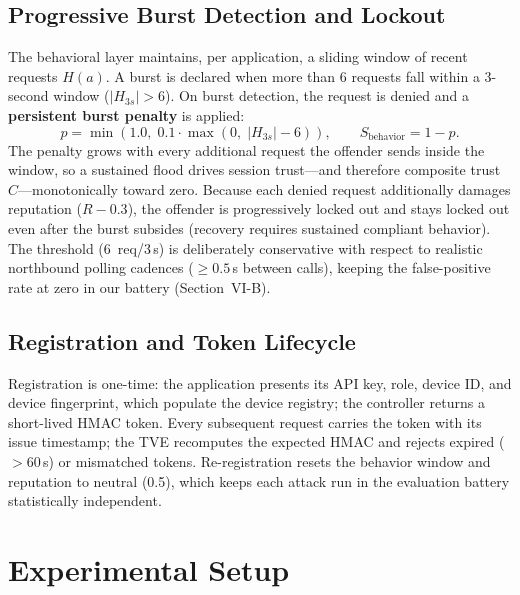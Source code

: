 \documentclass[journal]{IEEEtran}
\begin{document}
\subsection{Progressive Burst Detection and Lockout}
The behavioral layer maintains, per application, a sliding window of recent requests $H(a)$. A burst is declared when more than 6 requests fall within a 3-second window ($|H_{3s}| > 6$). On burst detection, the request is denied and a \textbf{persistent burst penalty} is applied:
\begin{equation}
p = \min\!\left(1.0,\; 0.1\cdot\max(0,\; |H_{3s}|-6)\right),\qquad S_{\text{behavior}} = 1 - p.
\end{equation}
The penalty grows with every additional request the offender sends inside the window, so a sustained flood drives session trust---and therefore composite trust $C$---monotonically toward zero. Because each denied request additionally damages reputation ($R-0.3$), the offender is progressively locked out and stays locked out even after the burst subsides (recovery requires sustained compliant behavior). The threshold (6~req/3\,s) is deliberately conservative with respect to realistic northbound polling cadences ($\geq 0.5$\,s between calls), keeping the false-positive rate at zero in our battery (Section~VI-B).

\subsection{Registration and Token Lifecycle}
Registration is one-time: the application presents its API key, role, device ID, and device fingerprint, which populate the device registry; the controller returns a short-lived HMAC token. Every subsequent request carries the token with its issue timestamp; the TVE recomputes the expected HMAC and rejects expired ($>60$\,s) or mismatched tokens. Re-registration resets the behavior window and reputation to neutral (0.5), which keeps each attack run in the evaluation battery statistically independent.

\section{Experimental Setup}
\end{document}
